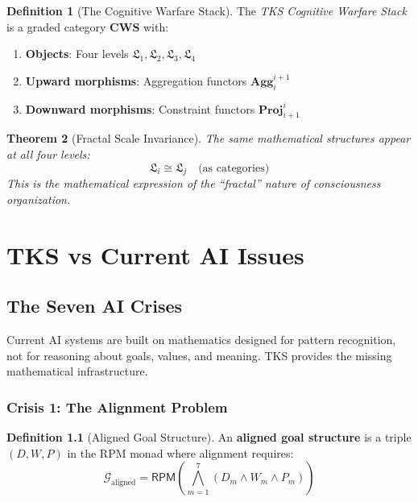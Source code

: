 \documentclass[11pt,twoside]{book}
\newcommand{\RPM}{\mathsf{RPM}}
\newcommand{\Level}[1]{\mathfrak{L}_{#1}}
\newcommand{\Aggregate}[2]{\mathbf{Agg}_{#1}^{#2}}
\newcommand{\Project}[2]{\mathbf{Proj}_{#1}^{#2}}
\newcommand{\AIGoal}{\mathcal{G}}
\theoremstyle{definition}
\newtheorem{definition}{Definition}[chapter]
\theoremstyle{plain}
\newtheorem{theorem}[definition]{Theorem}
\theoremstyle{remark}
\begin{document}
\begin{definition}[The Cognitive Warfare Stack]
The \emph{TKS Cognitive Warfare Stack} is a graded category $\mathbf{CWS}$ with:
\begin{enumerate}[label=(\roman*)]
    \item \textbf{Objects}: Four levels $\Level{1}, \Level{2}, \Level{3}, \Level{4}$
    \item \textbf{Upward morphisms}: Aggregation functors $\Aggregate{i}{i+1}$
    \item \textbf{Downward morphisms}: Constraint functors $\Project{i+1}{i}$
\end{enumerate}
\end{definition}

\begin{theorem}[Fractal Scale Invariance]
The same mathematical structures appear at all four levels:
\[
    \Level{i} \cong \Level{j} \quad \text{(as categories)}
\]
This is the mathematical expression of the ``fractal'' nature of consciousness organization.
\end{theorem}

\part{TKS vs Current AI Issues}

\chapter{The Seven AI Crises}
\label{ch:ai-crises}

\begin{tcolorbox}[colback=green!5!white,colframe=green!60!black,title=\textbf{TKS as AI Foundation}]
Current AI systems are built on mathematics designed for pattern recognition, not for reasoning about goals, values, and meaning. TKS provides the missing mathematical infrastructure.
\end{tcolorbox}

\section{Crisis 1: The Alignment Problem}

\begin{definition}[Aligned Goal Structure]
An \textbf{aligned goal structure} is a triple $(D, W, P)$ in the RPM monad where alignment requires:
\begin{equation}
\boxed{
\AIGoal_{\mathrm{aligned}} = \RPM\left(\bigwedge_{m=1}^{7} (D_m \wedge W_m \wedge P_m)\right)
}
\end{equation}
\end{definition}
\end{document}
